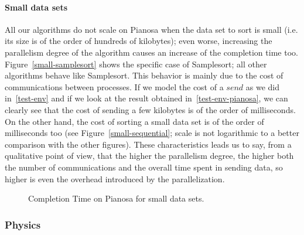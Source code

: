 \paragraph{Small data sets}
All our algorithms do not scale on Pianosa when the data set to sort is small (i.e. its size is of the order of hundreds of kilobytes); even worse, increasing the parallelism degree of the algorithm causes an increase of the completion time too. Figure~\ref{small-samplesort} shows the specific case of Samplesort; all other algorithms behave like Samplesort. This behavior is mainly due to the cost of communications between processes. If we model the cost of a $send$ as we did in~\ref{test-env} and if we look at the result obtained in~\ref{test-env-pianosa}, we can clearly see that the cost of sending a few kilobytes is of the order of milliseconds. On the other hand, the cost of sorting a small data set is of the order of milliseconds too (see Figure~\ref{small-sequential}; scale is not logarithmic to a better comparison with the other figures). These characteristics leads us to say, from a qualitative point of view, that the higher the parallelism degree, the higher both the number of communications and the overall time spent in sending data, so higher is even the overhead introduced by the parallelization. 

\begin{figure}[h]
	\centering
	\hspace*{20pt}
  	
  	\caption{Completion Time on Pianosa for small data sets.}
\end{figure}

\subsubsection{Physics}
